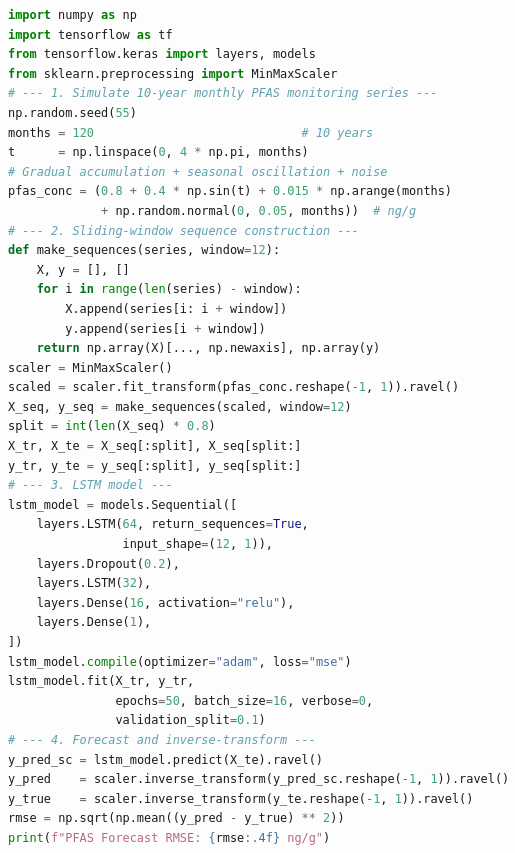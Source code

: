 \documentclass[environremediat,article,accept,pdftex,oneauthor]{Definitions/mdpi}
\begin{document}
\begin{lstlisting}[language=Python,basicstyle=\scriptsize\ttfamily,
    caption={Python %MDPI: Please check and confirm if * should be revised to multiplication sign.
% AUTHOR: The asterisk is the Python multiplication operator within the code and is correct as written; it should not be revised to a multiplication sign.
 workflow: %MDPI: Please check and confirm if ** need and explanation and if so, please add it.
% AUTHOR: The double asterisk is the Python exponentiation/keyword-argument operator and is standard code syntax; no explanation is needed.
 LSTM network for PFAS concentration
             time-series forecasting and long-term trend detection
             (Script~4).\vspace{4pt}},
    label={lst:lstm_pfas},xleftmargin=12pt,xrightmargin=3.5pt]
import numpy as np
import tensorflow as tf
from tensorflow.keras import layers, models
from sklearn.preprocessing import MinMaxScaler
# --- 1. Simulate 10-year monthly PFAS monitoring series ---
np.random.seed(55)
months = 120                             # 10 years
t      = np.linspace(0, 4 * np.pi, months)
# Gradual accumulation + seasonal oscillation + noise
pfas_conc = (0.8 + 0.4 * np.sin(t) + 0.015 * np.arange(months)
             + np.random.normal(0, 0.05, months))  # ng/g
# --- 2. Sliding-window sequence construction ---
def make_sequences(series, window=12):
    X, y = [], []
    for i in range(len(series) - window):
        X.append(series[i: i + window])
        y.append(series[i + window])
    return np.array(X)[..., np.newaxis], np.array(y)
scaler = MinMaxScaler()
scaled = scaler.fit_transform(pfas_conc.reshape(-1, 1)).ravel()
X_seq, y_seq = make_sequences(scaled, window=12)
split = int(len(X_seq) * 0.8)
X_tr, X_te = X_seq[:split], X_seq[split:]
y_tr, y_te = y_seq[:split], y_seq[split:]
# --- 3. LSTM model ---
lstm_model = models.Sequential([
    layers.LSTM(64, return_sequences=True,
                input_shape=(12, 1)),
    layers.Dropout(0.2),
    layers.LSTM(32),
    layers.Dense(16, activation="relu"),
    layers.Dense(1),
])
lstm_model.compile(optimizer="adam", loss="mse")
lstm_model.fit(X_tr, y_tr,
               epochs=50, batch_size=16, verbose=0,
               validation_split=0.1)
# --- 4. Forecast and inverse-transform ---
y_pred_sc = lstm_model.predict(X_te).ravel()
y_pred    = scaler.inverse_transform(y_pred_sc.reshape(-1, 1)).ravel()
y_true    = scaler.inverse_transform(y_te.reshape(-1, 1)).ravel()
rmse = np.sqrt(np.mean((y_pred - y_true) ** 2))
print(f"PFAS Forecast RMSE: {rmse:.4f} ng/g")
\end{lstlisting}
\end{document}
